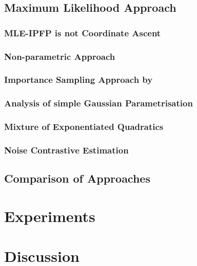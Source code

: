 \documentclass[a4paper,12pt,twoside,openright]{report}
\theoremstyle{definition}
\begin{document}
\section{Maximum Likelihood Approach \citep{pavon2018data}}
\subsection{MLE-IPFP is not Coordinate Ascent}
\subsection{Non-parametric Approach}
\subsection{Importance Sampling Approach by \citet{pavon2018data} }
\subsection{Analysis of simple Gaussian Parametrisation}
\subsection{Mixture of Exponentiated Quadratics}

\subsection{Noise Contrastive Estimation}
\section{Comparison of Approaches}

\chapter{Experiments}

\chapter{Discussion}


\appendix
\singlespacing

 
 
\end{document}

